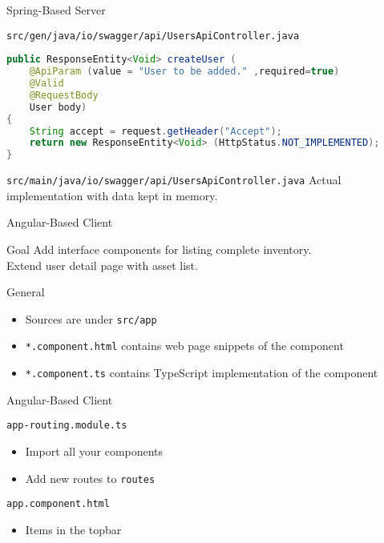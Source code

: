 \begin{frame}[fragile]{Spring-Based Server}
    \begin{block}{\lstinline{src/gen/java/io/swagger/api/UsersApiController.java}}
\begin{lstlisting}[language=java,style=mini]
public ResponseEntity<Void> createUser (
    @ApiParam (value = "User to be added." ,required=true)
    @Valid
    @RequestBody
    User body)
{
    String accept = request.getHeader("Accept");
    return new ResponseEntity<Void> (HttpStatus.NOT_IMPLEMENTED);
}
\end{lstlisting}
    \end{block}

    \begin{block}{\lstinline{src/main/java/io/swagger/api/UsersApiController.java}}
        Actual implementation with data kept in memory.
    \end{block}
\end{frame}


\begin{frame}{Angular-Based Client}
    \begin{block}{Goal}
        Add interface components for listing complete inventory. \\ Extend user detail page with asset list.
    \end{block}

    \begin{block}{General}
        \begin{itemize}
            \item Sources are under \lstinline{src/app}
            \item \lstinline{*.component.html} contains web page snippets of the component
            \item \lstinline{*.component.ts} contains TypeScript implementation of the component
        \end{itemize}
    \end{block}
\end{frame}


\begin{frame}{Angular-Based Client}
    \begin{block}{\lstinline{app-routing.module.ts}}
        \begin{itemize}
            \item Import all your components
            \item Add new routes to \lstinline{routes}
        \end{itemize}
    \end{block}

    \begin{block}{\lstinline{app.component.html}}
        \begin{itemize}
            \item Items in the topbar
        \end{itemize}
    \end{block}
\end{frame}


